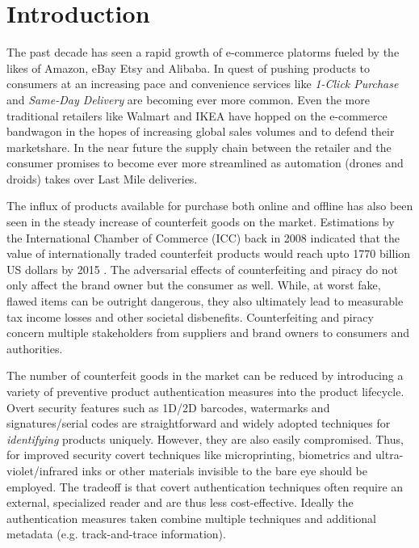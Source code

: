 \documentclass[thesis.tex]{subfiles}
\begin{document}
\chapter{Introduction}
\label{chapter:intro}

\enlargethispage{2\baselineskip}
The past decade has seen a rapid growth of e-commerce platorms fueled by the likes of Amazon, eBay Etsy and Alibaba. In quest of pushing products to consumers at an increasing pace and convenience services like \emph{1-Click Purchase} and \emph{Same-Day Delivery} are becoming ever more common. Even the more traditional retailers like Walmart and IKEA have hopped on the e-commerce bandwagon in the hopes of increasing global sales volumes and to defend their marketshare. In the near future the supply chain between the retailer and the consumer promises to become ever more streamlined as automation (drones and droids) takes over Last Mile deliveries.

The influx of products available for purchase both online and offline has also been seen in the steady increase of counterfeit goods on the market. Estimations by the International Chamber of Commerce (ICC) back in 2008 indicated that the value of internationally traded counterfeit products would reach upto 1770 billion US dollars by 2015 \cite{icc}. The adversarial effects of counterfeiting and piracy do not only affect the brand owner but the consumer as well. While, at worst fake, flawed items can be outright dangerous, they also ultimately lead to measurable tax income losses and other societal disbenefits. Counterfeiting and piracy concern multiple stakeholders from suppliers and brand owners to consumers and authorities.

The number of counterfeit goods in the market can be reduced by introducing a variety of preventive product authentication measures into the product lifecycle. Overt security features such as 1D/2D barcodes, watermarks and signatures/serial codes are straightforward and widely adopted techniques for \emph{identifying} products uniquely. However, they are also easily compromised. Thus, for improved security covert techniques like microprinting, biometrics and ultra-violet/infrared inks or other materials invisible to the bare eye should be employed. The tradeoff is that covert authentication techniques often require an external, specialized reader and are thus less cost-effective. Ideally the authentication measures taken combine multiple techniques and additional metadata (e.g. track-and-trace information).
\end{document}
